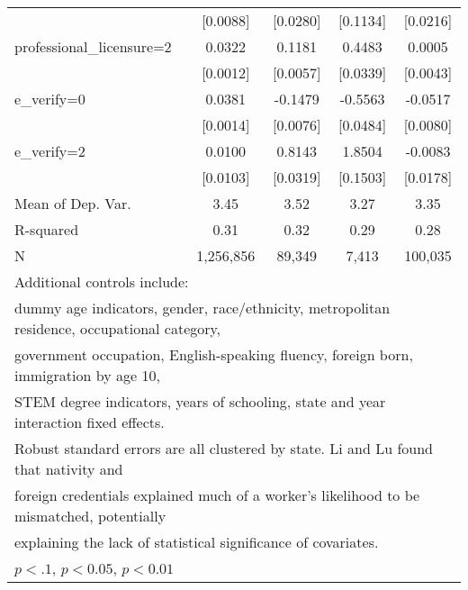\begin{table}[htbp]
\begin{tabular}{l*{4}{c}}
                    &    [0.0088]         &    [0.0280]         &    [0.1134]         &    [0.0216]         \\
\addlinespace
professional\_licensure=2&      0.0322\sym{***}&      0.1181\sym{***}&      0.4483\sym{***}&      0.0005         \\
                    &    [0.0012]         &    [0.0057]         &    [0.0339]         &    [0.0043]         \\
\addlinespace
e\_verify=0          &      0.0381\sym{***}&     -0.1479\sym{***}&     -0.5563\sym{***}&     -0.0517\sym{***}\\
                    &    [0.0014]         &    [0.0076]         &    [0.0484]         &    [0.0080]         \\
\addlinespace
e\_verify=2          &      0.0100         &      0.8143\sym{***}&      1.8504\sym{***}&     -0.0083         \\
                    &    [0.0103]         &    [0.0319]         &    [0.1503]         &    [0.0178]         \\
\midrule
Mean of Dep. Var.   &        3.45         &        3.52         &        3.27         &        3.35         \\
R-squared           &        0.31         &        0.32         &        0.29         &        0.28         \\
N                   &   1,256,856         &      89,349         &       7,413         &     100,035         \\
\bottomrule
\multicolumn{5}{l}{\footnotesize Additional controls include:}\\
\multicolumn{5}{l}{\footnotesize dummy age indicators, gender, race/ethnicity, metropolitan residence, occupational category,}\\
\multicolumn{5}{l}{\footnotesize government occupation, English-speaking fluency, foreign born, immigration by age 10,}\\
\multicolumn{5}{l}{\footnotesize STEM degree indicators, years of schooling, state and year interaction fixed effects.}\\
\multicolumn{5}{l}{\footnotesize Robust standard errors are all clustered by state. Li and Lu found that nativity and}\\
\multicolumn{5}{l}{\footnotesize foreign credentials explained much of a worker's likelihood to be mismatched, potentially}\\
\multicolumn{5}{l}{\footnotesize explaining the lack of statistical significance of covariates.}\\
\multicolumn{5}{l}{\footnotesize \sym{*} \(p<.1\), \sym{**} \(p<0.05\), \sym{***} \(p<0.01\)}\\
\end{tabular}
\end{table}
